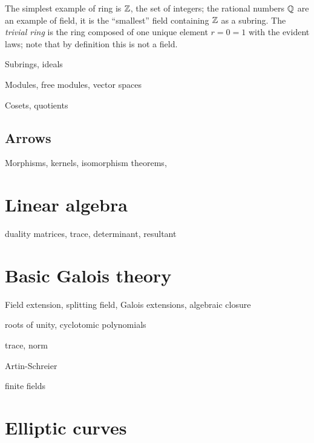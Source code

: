 The simplest example of ring is $\mathbb{Z}$, the set of integers; the
rational numbers $\mathbb{Q}$ are an example of field, it is the ``smallest''
field containing $\mathbb{Z}$ as a subring. The \emph{trivial
  ring} is the ring composed of one unique element $r=0=1$ with the
evident laws; note that by definition this is not a field.

Subrings, ideals

Modules, free modules, vector spaces

Cosets, quotients

\subsection{Arrows}
\label{sec:ring-fields:arrows}

Morphisms, kernels, isomorphism theorems, 

\section{Linear algebra}
\label{sec:linear-algebra}

duality
matrices, trace, determinant, resultant

\section{Basic Galois theory}
\label{sec:basic-galois-theory}
Field extension, splitting field, Galois extensions, algebraic closure

roots of unity, cyclotomic polynomials

trace, norm

Artin-Schreier

finite fields


\section{Elliptic curves}
\label{sec:elliptic-curves}





